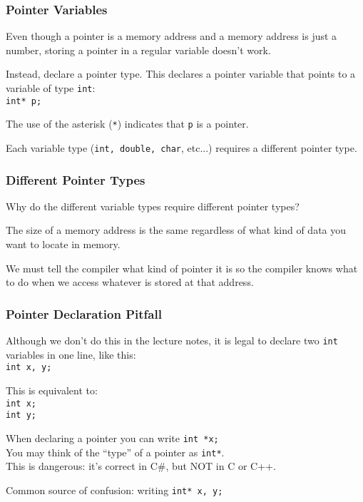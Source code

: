 \begin{frame}
\frametitle{Pointer Variables}
Even though a pointer is a memory address and a memory address is just a number, storing a pointer in a regular variable doesn't work.

Instead, declare a pointer type. This declares a pointer variable that points to a variable of type \texttt{int}:\\
\quad \texttt{int* p;}

The use of the asterisk (\texttt{*}) indicates that \texttt{p} is a pointer.

Each variable type (\texttt{int, double, char}, etc...) requires a different pointer type.

\end{frame}

\begin{frame}
\frametitle{Different Pointer Types}
Why do the different variable types require different pointer types?

The size of a memory address is the same regardless of what kind of data you want to locate in memory.

We must tell the compiler what kind of pointer it is so the compiler knows what to do when we access whatever is stored at that address.

\end{frame}

\begin{frame}
\frametitle{Pointer Declaration Pitfall}
Although we don't do this in the lecture notes, it is legal to declare two \texttt{int} variables in one line, like this:\\
\quad \texttt{int x, y;}

This is equivalent to:\\
\quad \texttt{int x;}\\
\quad \texttt{int y;}

When declaring a pointer you can write \texttt{int *x;}\\
\quad You may think of the ``type'' of a pointer as \texttt{int*}.\\
\quad This is dangerous: it's correct in C\#, but NOT in C or C++.

Common source of confusion: writing \texttt{int* x, y;}

\end{frame}

